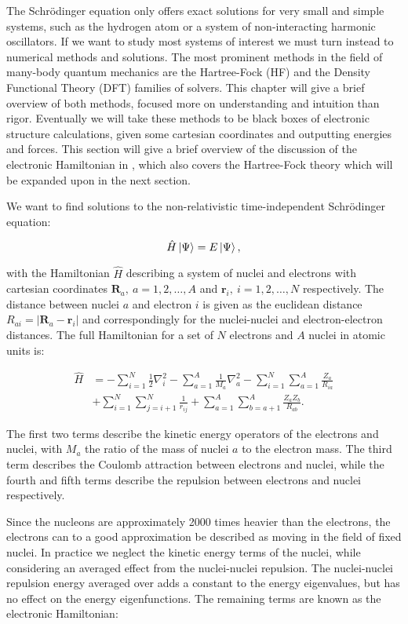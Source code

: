 The Schr\"{o}dinger equation only offers exact solutions
for very small and simple systems, such as the hydrogen atom
or a system of non-interacting harmonic oscillators.
If we want to study most systems of interest we must turn
instead to numerical methods and solutions.
The most prominent methods in the field of many-body
quantum mechanics are the Hartree-Fock (HF) and the
Density Functional Theory (DFT) families of solvers.
This chapter will give a brief overview of both methods,
focused more on understanding and intuition than rigor.
Eventually we will take these methods to be black boxes of
electronic structure calculations, given some cartesian
coordinates and outputting energies and forces.
This section will give a brief overview of the discussion
of the electronic Hamiltonian in \parencite[Szabo][pages 39-89]
{szabo1996modern}, which also covers the Hartree-Fock theory
which will be expanded upon in the next section.
\par
We want to find solutions to the non-relativistic time-independent
Schr\"{o}dinger equation:

\begin{equation}
 \hat{H} \ket{\Psi} = E \ket{\Psi} ,
\end{equation}

with the Hamiltonian $\hat{H}$ describing a system of nuclei and electrons
with cartesian coordinates $\bm{R}_a, \ a=1,2,\dots,A$ and $\bm{r}_i, \
i=1,2,\dots,N$ respectively. The distance between nuclei $a$
and electron $i$ is given as the euclidean distance
$R_{ai} = \left| \bm{R}_a - \bm{r}_i \right|$
and correspondingly for the nuclei-nuclei and electron-electron distances.
The full Hamiltonian for a set of $N$ electrons and $A$ nuclei
in atomic units is:

\begin{equation}
    \begin{split}
        \hat{H}
        &= -\sum_{i=1}^N \frac{1}{2} \nabla_i^2
        -\sum_{a=1}^A \frac{1}{M_a} \nabla_a^2
        -\sum_{i=1}^N \sum_{a=1}^A \frac{Z_a}{R_{ia}} \\
        &+ \sum_{i=1}^N \sum_{j=i+1}^N \frac{1}{r_{ij}}
        + \sum_{a=1}^A \sum_{b=a+1}^A \frac{Z_a Z_b}{R_{ab}} .
    \end{split}
\end{equation}

The first two terms describe the kinetic energy operators
of the electrons and nuclei, with $M_a$ the ratio of the mass
of nuclei $a$ to the electron mass. The third term describes the
Coulomb attraction between electrons and nuclei, while the fourth and fifth
terms describe the repulsion between electrons and nuclei respectively.
\par
Since the nucleons are approximately 2000 times heavier
than the electrons, the electrons can to a good approximation
be described as moving in the field of fixed nuclei. In practice we
neglect the kinetic energy terms of the nuclei, while considering
an averaged effect from the nuclei-nuclei repulsion.
The nuclei-nuclei repulsion energy averaged over 
adds a constant to the energy
eigenvalues, but has no effect on the energy eigenfunctions.
The remaining terms are known as the electronic Hamiltonian:

